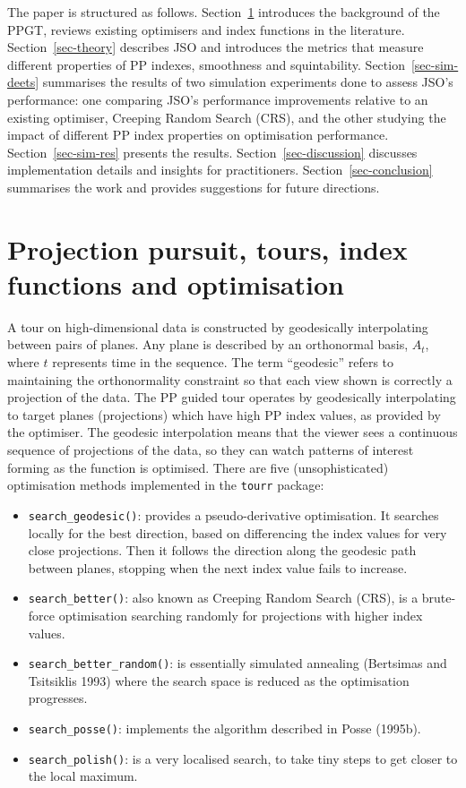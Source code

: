 \documentclass[
  12pt,
]{interact}
\providecommand{\tightlist}{%
  \setlength{\itemsep}{0pt}\setlength{\parskip}{0pt}}\usepackage{longtable,booktabs,array}
\theoremstyle{plain}
\begin{document}
The paper is structured as follows. Section~\ref{sec-background}
introduces the background of the PPGT, reviews existing optimisers and
index functions in the literature. Section~\ref{sec-theory} describes
JSO and introduces the metrics that measure different properties of PP
indexes, smoothness and squintability. Section~\ref{sec-sim-deets}
summarises the results of two simulation experiments done to assess
JSO's performance: one comparing JSO's performance improvements relative
to an existing optimiser, Creeping Random Search (CRS), and the other
studying the impact of different PP index properties on optimisation
performance. Section~\ref{sec-sim-res} presents the results.
Section~\ref{sec-discussion} discusses implementation details and
insights for practitioners. Section~\ref{sec-conclusion} summarises the
work and provides suggestions for future directions.

\section{Projection pursuit, tours, index functions and
optimisation}\label{sec-background}

A tour on high-dimensional data is constructed by geodesically
interpolating between pairs of planes. Any plane is described by an
orthonormal basis, \(A_t\), where \(t\) represents time in the sequence.
The term ``geodesic'' refers to maintaining the orthonormality
constraint so that each view shown is correctly a projection of the
data. The PP guided tour operates by geodesically interpolating to
target planes (projections) which have high PP index values, as provided
by the optimiser. The geodesic interpolation means that the viewer sees
a continuous sequence of projections of the data, so they can watch
patterns of interest forming as the function is optimised. There are
five (unsophisticated) optimisation methods implemented in the
\texttt{tourr} package:

\begin{itemize}
\tightlist
\item
  \texttt{search\_geodesic()}: provides a pseudo-derivative
  optimisation. It searches locally for the best direction, based on
  differencing the index values for very close projections. Then it
  follows the direction along the geodesic path between planes, stopping
  when the next index value fails to increase.
\item
  \texttt{search\_better()}: also known as Creeping Random Search (CRS),
  is a brute-force optimisation searching randomly for projections with
  higher index values.
\item
  \texttt{search\_better\_random()}: is essentially simulated annealing
  (Bertsimas and Tsitsiklis 1993) where the search space is reduced as
  the optimisation progresses.
\item
  \texttt{search\_posse()}: implements the algorithm described in Posse
  (1995b).
\item
  \texttt{search\_polish()}: is a very localised search, to take tiny
  steps to get closer to the local maximum.
\end{itemize}
\end{document}
